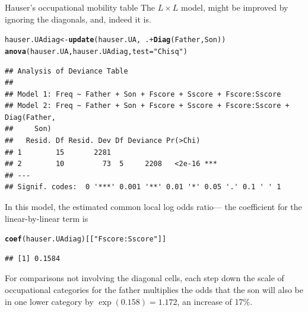 \documentclass[11pt]{book}\usepackage[]{graphicx}\usepackage[]{color}
\makeatletter
\newcommand{\hlstr}[1]{\textcolor[rgb]{0.192,0.494,0.8}{#1}}%
\newcommand{\hlopt}[1]{\textcolor[rgb]{0,0,0}{#1}}%
\newcommand{\hlstd}[1]{\textcolor[rgb]{0.345,0.345,0.345}{#1}}%
\newcommand{\hlkwb}[1]{\textcolor[rgb]{0.69,0.353,0.396}{#1}}%
\newcommand{\hlkwc}[1]{\textcolor[rgb]{0.333,0.667,0.333}{#1}}%
\newcommand{\hlkwd}[1]{\textcolor[rgb]{0.737,0.353,0.396}{\textbf{#1}}}%
\newenvironment{kframe}{%
 \def\at@end@of@kframe{}%
 \ifinner\ifhmode%
  \def\at@end@of@kframe{\end{minipage}}%
  \begin{minipage}{\columnwidth}%
 \fi\fi%
 \def\FrameCommand##1{\hskip\@totalleftmargin \hskip-\fboxsep
 \colorbox{shadecolor}{##1}\hskip-\fboxsep
     \hskip-\linewidth \hskip-\@totalleftmargin \hskip\columnwidth}%
 \MakeFramed {\advance\hsize-\width
   \@totalleftmargin\z@ \linewidth\hsize
   \@setminipage}}%
 {\par\unskip\endMakeFramed%
 \at@end@of@kframe}
\newenvironment{knitrout}{}{} %
\renewenvironment{knitrout}{\small\renewcommand{\baselinestretch}{.85}}{} %
\makeatother
\begin{document}
\begin{Example}[hauser2]{Hauser's occupational mobility table}
The $L \times L$ model,  might be improved by ignoring the
diagonals, and, indeed it is.
\begin{knitrout}
\color{fgcolor}\begin{kframe}
\begin{alltt}
\hlstd{hauser.UAdiag} \hlkwb{<-} \hlkwd{update}\hlstd{(hauser.UA,} \hlopt{~} \hlstd{.} \hlopt{+} \hlkwd{Diag}\hlstd{(Father,Son))}
\hlkwd{anova}\hlstd{(hauser.UA, hauser.UAdiag,} \hlkwc{test}\hlstd{=}\hlstr{"Chisq"}\hlstd{)}
\end{alltt}
\begin{verbatim}
## Analysis of Deviance Table
## 
## Model 1: Freq ~ Father + Son + Fscore + Sscore + Fscore:Sscore
## Model 2: Freq ~ Father + Son + Fscore + Sscore + Fscore:Sscore + Diag(Father, 
##     Son)
##   Resid. Df Resid. Dev Df Deviance Pr(>Chi)    
## 1        15       2281                         
## 2        10         73  5     2208   <2e-16 ***
## ---
## Signif. codes:  0 '***' 0.001 '**' 0.01 '*' 0.05 '.' 0.1 ' ' 1
\end{verbatim}
\end{kframe}
\end{knitrout}
In this model, the estimated common local log odds ratio---
the coefficient for the linear-by-linear term
 is
\begin{knitrout}
\color{fgcolor}\begin{kframe}
\begin{alltt}
\hlkwd{coef}\hlstd{(hauser.UAdiag)[[}\hlstr{"Fscore:Sscore"}\hlstd{]]}
\end{alltt}
\begin{verbatim}
## [1] 0.1584
\end{verbatim}
\end{kframe}
\end{knitrout}
\noindent For comparisons not involving the diagonal cells,
each step down the scale of occupational categories for the father
multiplies the odds that the son will also be in one lower
category by $\exp (0.158) = 1.172$, an increase of 17\%.


\end{Example}
\end{document}
